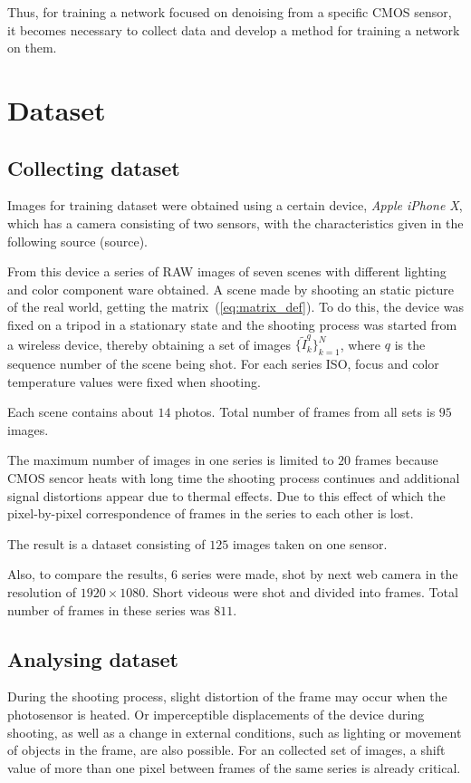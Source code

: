 \documentclass[runningheads]{llncs}
\begin{document}
Thus, for training a network focused on denoising from a specific CMOS sensor, it becomes necessary to collect data and develop a method for training a network on them.

\section{Dataset}

\subsection{Collecting dataset}

Images for training dataset were obtained using a certain device, \textit{Apple iPhone X}, which has a camera consisting of two sensors, with the characteristics given in the following source (source).

From this device a series of RAW images of seven scenes with different lighting and color component ware obtained. A scene made by shooting an static picture of the real world, getting the matrix~(\ref{eq:matrix_def}). To do this, the device was fixed on a tripod in a stationary state and the shooting process was started from a wireless device, thereby obtaining a set of images $\{\tilde{I}^q_k\}_{k=1}^{N}$, where $q$ is the sequence number of the scene being shot. For each series ISO, focus and color temperature values were fixed when shooting.

Each scene contains about $14$ photos. Total number of frames from all sets is $ 95 $ images.

The maximum number of images in one series is limited to $20$ frames because CMOS sencor heats with long time the shooting process continues and additional signal distortions appear due to thermal effects. Due to this effect of which the pixel-by-pixel correspondence of frames in the series to each other is lost.

The result is a dataset consisting of $125$ images taken on one sensor.

Also, to compare the results, 6 series were made, shot by next web camera in the resolution of $1920\times1080$. Short videous were shot and divided into frames. Total number of frames in these series was $811$.

\subsection{Analysing dataset}
During the shooting process, slight distortion of the frame may occur when the photosensor is heated. Or imperceptible displacements of the device during shooting, as well as a change in external conditions, such as lighting or movement of objects in the frame, are also possible. For an collected set of images, a shift value of more than one pixel between frames of the same series is already critical.
\end{document}
